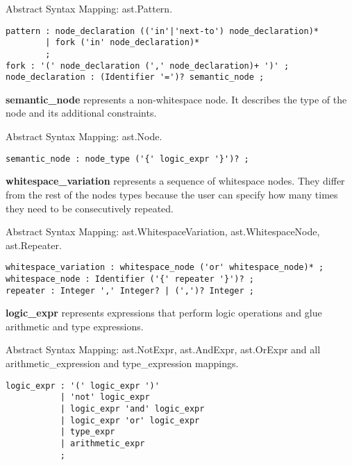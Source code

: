 \documentclass[parskip=full]{uvamscse}
\begin{document}
\begin{description}
Abstract Syntax Mapping: ast.Pattern.

\begin{snippet}
\begin{verbatim}
pattern : node_declaration (('in'|'next-to') node_declaration)*
        | fork ('in' node_declaration)*
        ;
fork : '(' node_declaration (',' node_declaration)+ ')' ;
node_declaration : (Identifier '=')? semantic_node ;
\end{verbatim}
\end{snippet}

\item\textbf{semantic\_node} represents a non-whitespace node. It describes the type of the node and its additional constraints. 

Abstract Syntax Mapping: ast.Node.

\begin{snippet}
\begin{verbatim}
semantic_node : node_type ('{' logic_expr '}')? ;
\end{verbatim}
\end{snippet}

\item\textbf{whitespace\_variation} represents a sequence of whitespace nodes. They differ from the rest of the nodes types because the user can specify how many times they need to be consecutively repeated. 

Abstract Syntax Mapping: ast.WhitespaceVariation, ast.WhitespaceNode, ast.Repeater.

\begin{snippet}
\begin{verbatim}
whitespace_variation : whitespace_node ('or' whitespace_node)* ;
whitespace_node : Identifier ('{' repeater '}')? ;
repeater : Integer ',' Integer? | (',')? Integer ;
\end{verbatim}
\end{snippet}

\item\textbf{logic\_expr} represents expressions that perform logic operations and glue arithmetic and type expressions. 

Abstract Syntax Mapping: ast.NotExpr, ast.AndExpr, ast.OrExpr and all arithmetic\_expression and type\_expression mappings.

\begin{snippet}
\begin{verbatim}
logic_expr : '(' logic_expr ')'
           | 'not' logic_expr
           | logic_expr 'and' logic_expr
           | logic_expr 'or' logic_expr
           | type_expr
           | arithmetic_expr
           ;
\end{verbatim}
\end{snippet}


\end{description}
\end{document}
